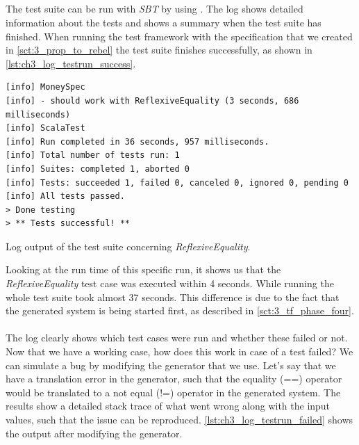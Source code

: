 \subsection{\tfPhaseFive{}}
The test suite can be run with \textit{SBT} by using . The log
shows detailed information about the tests and shows a summary when the test
suite has finished. When running the test framework with the specification that
we created in \autoref{sct:3_prop_to_rebel} the test suite finishes
successfully, as shown in \autoref{lst:ch3_log_testrun_success}.
\begin{sourcecode}[!ht]
\begin{lstlisting}[language=Log]
[info] MoneySpec
[info] - should work with ReflexiveEquality (3 seconds, 686 milliseconds)
[info] ScalaTest
[info] Run completed in 36 seconds, 957 milliseconds.
[info] Total number of tests run: 1
[info] Suites: completed 1, aborted 0
[info] Tests: succeeded 1, failed 0, canceled 0, ignored 0, pending 0
[info] All tests passed.
> Done testing
> ** Tests successful! **
\end{lstlisting}
\caption{Log output of the test suite concerning \textit{ReflexiveEquality}.}
\label{lst:ch3_log_testrun_success}
\end{sourcecode}
\FloatBarrier\noindent
Looking at the run time of this specific run, it shows us that the
\textit{ReflexiveEquality} test case was executed within 4 seconds. While
running the whole test suite took almost 37 seconds. This difference is due to
the fact that the generated system is being started first, as described in
\autoref{sct:3_tf_phase_four}.\\
\\
The log clearly shows which test cases were run and whether these failed or
not. Now that we have a working case, how does this work in case of a test
failed? We can simulate a bug by modifying the generator that we use. Let's say
that we have a translation error in the generator, such that the equality (==)
operator would be translated to a not equal (!=) operator in the generated
system. The results show a detailed stack trace of what went wrong along with
the input values, such that the issue can be reproduced.
\autoref{lst:ch3_log_testrun_failed} shows the output after modifying the
generator.
